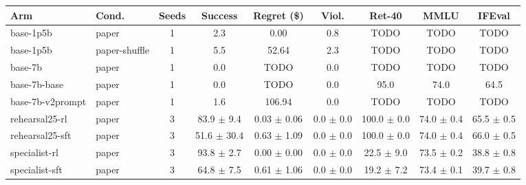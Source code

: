 \begin{tabular}{llccccccc}
\toprule
Arm & Cond. & Seeds & Success & Regret (\$) & Viol. & Ret-40 & MMLU & IFEval \\
\midrule
base-1p5b & paper & 1 & 2.3 & 0.00 & 0.8 & TODO & TODO & TODO \\
base-1p5b & paper-shuffle & 1 & 5.5 & 52.64 & 2.3 & TODO & TODO & TODO \\
base-7b & paper & 1 & 0.0 & TODO & 0.0 & TODO & TODO & TODO \\
base-7b-base & paper & 1 & 0.0 & TODO & 0.0 & 95.0 & 74.0 & 64.5 \\
base-7b-v2prompt & paper & 1 & 1.6 & 106.94 & 0.0 & TODO & TODO & TODO \\
rehearsal25-rl & paper & 3 & 83.9 $\pm$ 9.4 & 0.03 $\pm$ 0.06 & 0.0 $\pm$ 0.0 & 100.0 $\pm$ 0.0 & 74.0 $\pm$ 0.4 & 65.5 $\pm$ 0.5 \\
rehearsal25-sft & paper & 3 & 51.6 $\pm$ 30.4 & 0.63 $\pm$ 1.09 & 0.0 $\pm$ 0.0 & 100.0 $\pm$ 0.0 & 74.0 $\pm$ 0.4 & 66.0 $\pm$ 0.5 \\
specialist-rl & paper & 3 & 93.8 $\pm$ 2.7 & 0.00 $\pm$ 0.00 & 0.0 $\pm$ 0.0 & 22.5 $\pm$ 9.0 & 73.5 $\pm$ 0.2 & 38.8 $\pm$ 0.8 \\
specialist-sft & paper & 3 & 64.8 $\pm$ 7.5 & 0.61 $\pm$ 1.06 & 0.0 $\pm$ 0.0 & 19.2 $\pm$ 7.2 & 73.4 $\pm$ 0.1 & 39.7 $\pm$ 0.8 \\
\bottomrule
\end{tabular}

